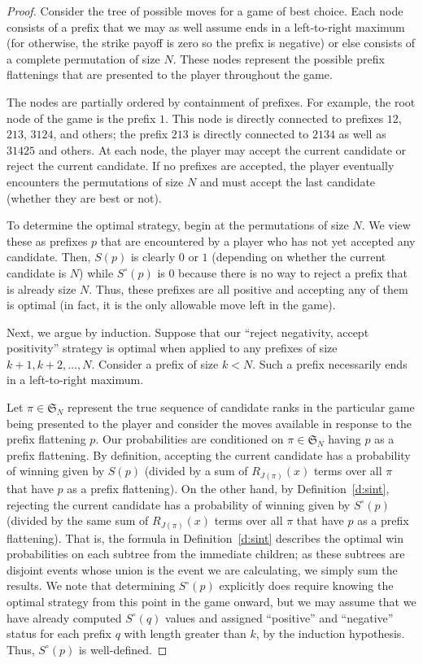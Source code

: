 \documentclass[10pt,a4paper]{amsart}
\newcommand{\SN}{\mathfrak{S}}
\begin{document}
\begin{proof}
Consider the tree of possible moves for a game of best choice.  Each node
consists of a prefix that we may as well assume ends in a left-to-right maximum
(for otherwise, the strike payoff is zero so the prefix is negative) or else
consists of a complete permutation of size $N$.  These nodes represent the
possible prefix flattenings that are presented to the player throughout the
game.

The nodes are partially ordered by containment of prefixes.  For example, the
root node of the game is the prefix $1$.  This node is directly connected to
prefixes $12$, $213$, $3124$, and others; the prefix $213$ is directly
connected to $2134$ as well as $31425$ and others.  At each node, the player
may accept the current candidate or reject the current candidate.  If no
prefixes are accepted, the player eventually encounters the permutations of
size $N$ and must accept the last candidate (whether they are best or not).

To determine the optimal strategy, begin at the permutations of size $N$.  We
view these as prefixes $p$ that are encountered by a player who has not yet
accepted any candidate.  Then, $S(p)$ is clearly $0$ or $1$ (depending on
whether the current candidate is $N$) while $S^\circ(p)$ is $0$ because there
is no way to reject a prefix that is already size $N$.  Thus, these prefixes
are all positive and accepting any of them is optimal (in fact, it is the
only allowable move left in the game).

Next, we argue by induction.  Suppose that our ``reject negativity, accept
positivity'' strategy is optimal when applied to any prefixes of size $k+1,
k+2, \ldots, N$.  Consider a prefix of size $k < N$.  Such a prefix necessarily
ends in a left-to-right maximum.

Let $\pi \in \SN_N$ represent the true sequence of candidate ranks in the
particular game being presented to the player and consider the moves available
in response to the prefix flattening $p$.  Our probabilities are conditioned on
$\pi \in \SN_N$ having $p$ as a prefix flattening.  By definition, accepting
the current candidate has a probability of winning given by $S(p)$ (divided by
a sum of $R_{J(\pi)}(x)$ terms over all $\pi$ that have $p$ as a prefix
flattening).  On the other hand, by Definition~\ref{d:sint}, rejecting the
current candidate has a probability of winning given by $S^\circ(p)$ (divided
by the same sum of $R_{J(\pi)}(x)$ terms over all $\pi$ that have $p$ as a
prefix flattening).  That is, the formula in Definition~\ref{d:sint} describes
the optimal win probabilities on each subtree from the immediate children; as
these subtrees are disjoint events whose union is the event we are calculating,
we simply sum the results.  We note that determining $S^\circ(p)$ explicitly
does require knowing the optimal strategy from this point in the game onward,
but we may assume that we have already computed $S^\circ(q)$ values and
assigned ``positive'' and ``negative'' status for each prefix $q$ with length
greater than $k$, by the induction hypothesis.  Thus, $S^\circ(p)$ is
well-defined.


\end{proof}
\end{document}
